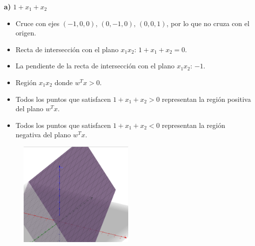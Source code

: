 \documentclass{article}
\begin{document}
\textbf{a) } $1 + x_1 + x_2$  
\begin{itemize}
    \item Cruce con ejes $(-1, 0, 0)$, $(0, -1, 0)$, $(0, 0, 1)$, por lo que no cruza con el origen.
    \item Recta de intersección con el plano $x_1x_2$: $1 + x_1 + x_2 = 0$.
    \item La pendiente de la recta de intersección con el plano $x_1x_2$: $-1$.
    \item Región $x_1x_2$ donde $w^T x > 0$.
    \item Todos los puntos que satisfacen $1 + x_1 + x_2 > 0$ representan la región positiva del plano $w^T x$.
    \item Todos los puntos que satisfacen $1 + x_1 + x_2 < 0$ representan la región negativa del plano $w^T x$.
\end{itemize}
\begin{figure}[H]
    \centering
    \includegraphics[width=0.5\textwidth]{Imagen1.png}  %
\end{figure}
\end{document}
